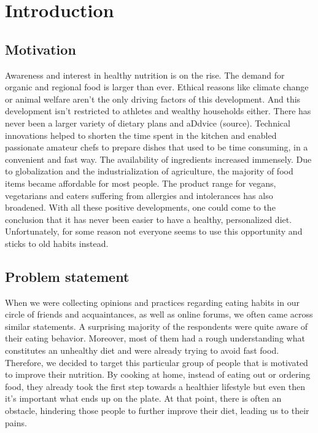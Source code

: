 \chapter{Introduction}
\section{Motivation}
Awareness and interest in healthy nutrition is on the rise. The demand for organic and regional food is larger than ever. Ethical reasons like climate change or animal welfare aren’t the only driving factors of this development. And this development isn’t restricted to athletes and wealthy households either. There has never been a larger variety of dietary plans and aDdvice (source). Technical innovations helped to shorten the time spent in the kitchen and enabled passionate amateur chefs to prepare dishes that used to be time consuming, in a convenient and fast way. The availability of ingredients increased immensely. Due to globalization and the industrialization of agriculture, the majority of food items became affordable for most people. The product range for vegans, vegetarians and eaters suffering from allergies and intolerances has also broadened. With all these positive developments, one could come to the conclusion that it has never been easier to have a healthy, personalized diet. Unfortunately, for some reason not everyone seems to use this opportunity and sticks to old habits instead.
\section{Problem statement}
When we were collecting opinions and practices regarding eating habits in our circle of friends and acquaintances, as well as online forums, we often came across similar statements. A surprising majority of the respondents were quite aware of their eating behavior. Moreover, most of them had a rough understanding what constitutes an unhealthy diet and were already trying to avoid fast food. Therefore, we decided to target this particular group of people that is motivated to improve their nutrition. By cooking at home, instead of eating out or ordering food, they already took the first step towards a healthier lifestyle but even then it’s important what ends up on the plate. At that point, there is often an obstacle, hindering those people to further improve their diet, leading us to their pains.

